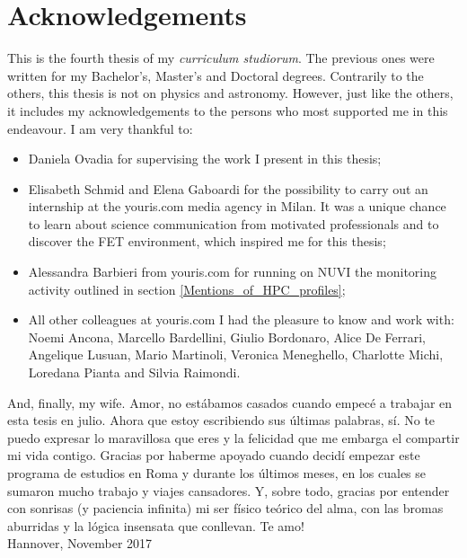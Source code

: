 \chapter*{Acknowledgements}
This is the fourth thesis of my \textit{curriculum studiorum}. The previous ones were written for my Bachelor's, Master's and Doctoral degrees. Contrarily to the others, this thesis is not on physics and astronomy. However, just like the others, it includes my acknowledgements to the persons who most supported me in this endeavour. I am very thankful to:
  
\begin{itemize}
 \item Daniela Ovadia for supervising the work I present in this thesis;
 \item Elisabeth Schmid and Elena Gaboardi for the possibility to carry out an internship at the youris.com media agency in Milan. It was a unique chance to learn about science communication from motivated professionals and to discover the FET environment, which inspired me for this thesis; 
 \item Alessandra Barbieri from youris.com for running on NUVI the monitoring activity outlined in section \ref{Mentions_of_HPC_profiles};
 \item All other colleagues at youris.com I had the pleasure to know and work with: Noemi Ancona, Marcello Bardellini, Giulio Bordonaro, Alice De Ferrari, Angelique Lusuan, Mario Martinoli, Veronica Meneghello, Charlotte Michi, Loredana Pianta and Silvia Raimondi.
\end{itemize}

\noindent
And, finally, my wife. Amor, no est\'abamos casados cuando empec\'e a trabajar en esta tesis  en julio. Ahora que estoy escribiendo sus \'ultimas palabras, s\'i. No te puedo expresar lo maravillosa que eres y la felicidad que me embarga el compartir mi vida contigo. Gracias por haberme apoyado cuando decid\'i empezar este programa de estudios en Roma y durante los \'ultimos meses, en los cuales se sumaron mucho trabajo y viajes cansadores. Y, sobre todo, gracias por entender con sonrisas (y paciencia infinita) mi ser f\'isico te\'orico del alma, con las bromas aburridas y la l\'ogica insensata que conllevan. Te amo! \\

\noindent
Hannover, November 2017